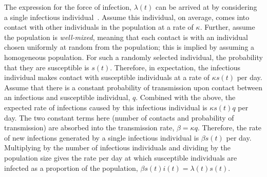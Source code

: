\documentclass[thesis.tex]{subfiles}
\begin{document}
The expression for the force of infection, $\lambda(t)$ can be arrived at by considering a single infectious individual~\autocite[214]{kretzschmarMathematical}.
Assume this individual, on average, comes into contact with other individuals in the population at a rate of $\kappa$.
Further, assume the population is \emph{well-mixed}, meaning that each contact is with an individual chosen uniformly at random from the population; this is implied by assuming a homogeneous population.
For such a randomly selected individual, the probability that they are susceptible is $s(t)$.
Therefore, in expectation, the infectious individual makes contact with susceptible individuals at a rate of $\kappa s(t)$ per day.
Assume that there is a constant probability of transmission upon contact between an infectious and susceptible individual, $q$.
Combined with the above, the expected rate of infections caused by this infectious individual is $\kappa s(t) q$ per day.
The two constant terms here (number of contacts and probability of transmission) are absorbed into the transmission rate, $\beta = \kappa q$.
Therefore, the rate of new infections generated by a single infectious individual is $\beta s(t)$ per day.
Multiplying by the number of infectious individuals and dividing by the population size gives the rate per day at which susceptible individuals are infected as a proportion of the population, $\beta s(t) i(t) = \lambda(t) s(t)$.

\end{document}
